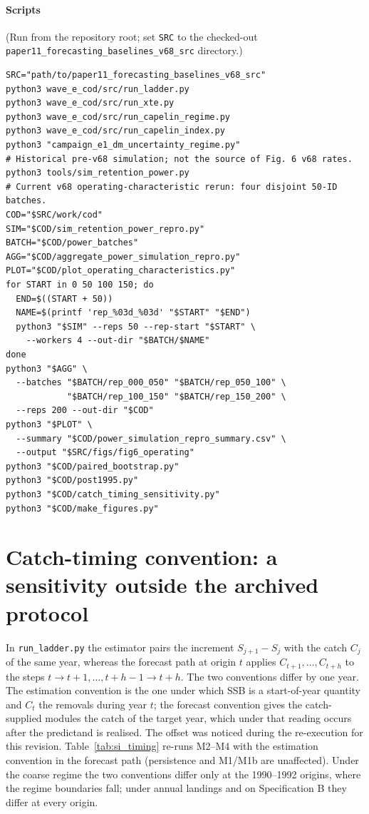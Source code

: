\paragraph{Scripts} (Run from the repository root; set \texttt{SRC} to the checked-out \texttt{paper11\_forecasting\_\allowbreak{}baselines\_v68\_src} directory.)
{\footnotesize\begin{verbatim}
SRC="path/to/paper11_forecasting_baselines_v68_src"
python3 wave_e_cod/src/run_ladder.py
python3 wave_e_cod/src/run_xte.py
python3 wave_e_cod/src/run_capelin_regime.py
python3 wave_e_cod/src/run_capelin_index.py
python3 "campaign_e1_dm_uncertainty_regime.py"
# Historical pre-v68 simulation; not the source of Fig. 6 v68 rates.
python3 tools/sim_retention_power.py
# Current v68 operating-characteristic rerun: four disjoint 50-ID batches.
COD="$SRC/work/cod"
SIM="$COD/sim_retention_power_repro.py"
BATCH="$COD/power_batches"
AGG="$COD/aggregate_power_simulation_repro.py"
PLOT="$COD/plot_operating_characteristics.py"
for START in 0 50 100 150; do
  END=$((START + 50))
  NAME=$(printf 'rep_%03d_%03d' "$START" "$END")
  python3 "$SIM" --reps 50 --rep-start "$START" \
    --workers 4 --out-dir "$BATCH/$NAME"
done
python3 "$AGG" \
  --batches "$BATCH/rep_000_050" "$BATCH/rep_050_100" \
            "$BATCH/rep_100_150" "$BATCH/rep_150_200" \
  --reps 200 --out-dir "$COD"
python3 "$PLOT" \
  --summary "$COD/power_simulation_repro_summary.csv" \
  --output "$SRC/figs/fig6_operating"
python3 "$COD/paired_bootstrap.py"
python3 "$COD/post1995.py"
python3 "$COD/catch_timing_sensitivity.py"
python3 "$COD/make_figures.py"
\end{verbatim}}

\FloatBarrier
\section{Catch-timing convention: a sensitivity outside the archived protocol}\label{si:timing}

In \texttt{run\_ladder.py} the estimator pairs the increment $S_{j+1}-S_j$ with the catch $C_j$ of the same year, whereas the forecast path at origin $t$ applies $C_{t+1},\dots,C_{t+h}$ to the steps $t\to t+1,\dots,t+h-1\to t+h$. The two conventions differ by one year. The estimation convention is the one under which SSB is a start-of-year quantity and $C_t$ the removals during year $t$; the forecast convention gives the catch-supplied modules the catch of the target year, which under that reading occurs after the predictand is realised. The offset was noticed during the re-execution for this revision. Table~\ref{tab:si_timing} re-runs M2--M4 with the estimation convention in the forecast path (persistence and M1/M1b are unaffected). Under the coarse regime the two conventions differ only at the 1990--1992 origins, where the regime boundaries fall; under annual landings and on Specification B they differ at every origin.

